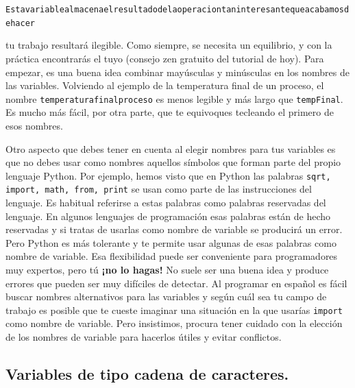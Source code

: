 \documentclass[10pt,a4paper]{article}\usepackage[]{graphicx}\usepackage[]{color}
\makeatletter
\newcommand{\hlstd}[1]{\textcolor[rgb]{0.345,0.345,0.345}{#1}}%
\newenvironment{kframe}{%
 \def\at@end@of@kframe{}%
 \ifinner\ifhmode%
  \def\at@end@of@kframe{\end{minipage}}%
  \begin{minipage}{\columnwidth}%
 \fi\fi%
 \def\FrameCommand##1{\hskip\@totalleftmargin \hskip-\fboxsep
 \colorbox{shadecolor}{##1}\hskip-\fboxsep
     \hskip-\linewidth \hskip-\@totalleftmargin \hskip\columnwidth}%
 \MakeFramed {\advance\hsize-\width
   \@totalleftmargin\z@ \linewidth\hsize
   \@setminipage}}%
 {\par\unskip\endMakeFramed%
 \at@end@of@kframe}
\newenvironment{knitrout}{}{} %
\newcounter {cont01}
\makeatother
\begin{document}
\begin{knitrout}
\color{fgcolor}\begin{kframe}
\begin{alltt}
\hlstd{Estavariablealmacenaelresultadodelaoperaciontaninteresantequeacabamosdehacer}
\end{alltt}
\end{kframe}
\end{knitrout}
tu trabajo resultará ilegible. Como siempre, se necesita un equilibrio, y con la práctica encontrarás el tuyo (consejo zen gratuito del tutorial de hoy). Para empezar, es una buena idea combinar mayúsculas y minúsculas en los nombres de las variables. Volviendo al ejemplo de la temperatura final de un proceso, el nombre {\tt temperaturafinalproceso} es menos legible y más largo que {\tt tempFinal}. Es mucho más fácil, por otra parte, que te equivoques tecleando el primero de esos nombres.

Otro aspecto que debes tener en cuenta al elegir nombres para tus variables es que no debes usar como  nombres aquellos símbolos que forman parte del propio lenguaje Python. Por ejemplo, hemos visto que en Python las palabras {\tt sqrt, import, math, from, print} se usan como parte de las instrucciones del lenguaje. Es habitual referirse a estas palabras como {\sf palabras reservadas} del lenguaje. En algunos lenguajes de programación esas palabras están de hecho reservadas y si tratas de usarlas como nombre de variable se producirá un error. Pero Python es más tolerante y te permite usar algunas de esas palabras como nombre de variable. Esa flexibilidad puede ser conveniente para programadores muy expertos, pero tú {\bf ¡no lo hagas!} No suele ser una buena idea y produce errores que pueden ser muy difíciles de detectar.  Al programar en español es fácil buscar nombres alternativos para las variables y según cuál sea tu campo de trabajo es posible que te cueste imaginar una situación en la que usarías {\tt import} como nombre de variable. Pero insistimos, procura tener cuidado con la elección de los nombres de variable para hacerlos útiles y evitar conflictos.

\subsection*{Variables de tipo cadena de caracteres.}
\label{tut02:subsection:variablesCadenaCaracteres}
\end{document}
